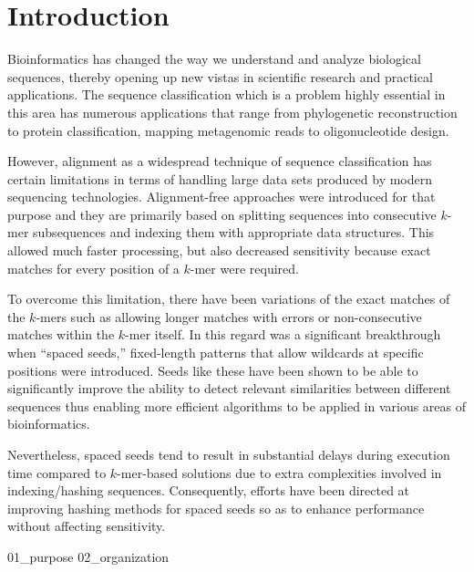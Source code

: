 \chapter{Introduction}
\label{chp:introduction}

Bioinformatics has changed the way we understand and analyze biological sequences, thereby opening up new vistas in scientific research and practical applications. The sequence classification which is a problem highly essential in this area has numerous applications that range from phylogenetic reconstruction to protein classification, mapping metagenomic reads to oligonucleotide design.

However, alignment as a widespread technique of sequence classification has certain limitations in terms of handling large data sets produced by modern sequencing technologies. Alignment-free approaches were introduced for that purpose and they are primarily based on splitting sequences into consecutive $k$-mer subsequences and indexing them with appropriate data structures. This allowed much faster processing, but also decreased sensitivity because exact matches for every position of a $k$-mer were required.

To overcome this limitation, there have been variations of the exact matches of the $k$-mers such as allowing longer matches with errors or non-consecutive matches within the $k$-mer itself. In this regard was a significant breakthrough when “spaced seeds,” fixed-length patterns that allow wildcards at specific positions were introduced. Seeds like these have been shown to be able to significantly improve the ability to detect relevant similarities between different sequences thus enabling more efficient algorithms to be applied in various areas of bioinformatics.

Nevertheless, spaced seeds tend to result in substantial delays during execution time compared to $k$-mer-based solutions due to extra complexities involved in indexing/hashing sequences. Consequently, efforts have been directed at improving hashing methods for spaced seeds so as to enhance performance without affecting sensitivity.



{01_purpose}
{02_organization}
